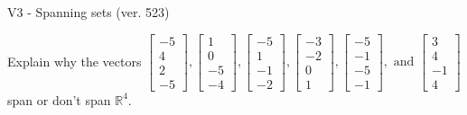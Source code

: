 \begin{exercise}
  \begin{exerciseTitle}V3 - Spanning sets (ver. 523)\end{exerciseTitle}
  \begin{exerciseStatement}
    Explain why the vectors \(\left[\begin{array}{r}
-5 \\
4 \\
2 \\
-5
\end{array}\right] , \left[\begin{array}{r}
1 \\
0 \\
-5 \\
-4
\end{array}\right] , \left[\begin{array}{r}
-5 \\
1 \\
-1 \\
-2
\end{array}\right] , \left[\begin{array}{r}
-3 \\
-2 \\
0 \\
1
\end{array}\right] , \left[\begin{array}{r}
-5 \\
-1 \\
-5 \\
-1
\end{array}\right] , \text{ and } \left[\begin{array}{r}
3 \\
4 \\
-1 \\
4
\end{array}\right]\) span or don't span \(\mathbb{R}^4\). 
	



\end{exerciseStatement}
\end{exercise}
